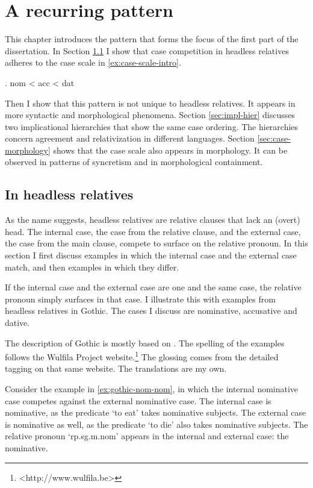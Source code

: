 
\chapter{A recurring pattern}\label{ch:recurring}

This chapter introduces the pattern that forms the focus of the first part of the dissertation. In Section \ref{sec:pattern-rels} I show that case competition in headless relatives adheres to the case scale in \ref{ex:case-scale-intro}.

\ex. \ac{nom} < \ac{acc} < \ac{dat}\label{ex:case-scale-intro}

Then I show that this pattern is not unique to headless relatives. It appears in more syntactic and morphological phenomena. Section \ref{sec:impl-hier} discusses two implicational hierarchies that show the same case ordering. The hierarchies concern agreement and relativization in different languages. Section \ref{sec:case-morphology} shows that the case scale also appears in morphology. It can be observed in patterns of syncretism and in morphological containment.


\section{In headless relatives}\label{sec:pattern-rels}

As the name suggests, headless relatives are relative clauses that lack an (overt) head. The internal case, the case from the relative clause, and the external case, the case from the main clause, compete to surface on the relative pronoun. In this section I first discuss examples in which the internal case and the external case match, and then examples in which they differ.

If the internal case and the external case are one and the same case, the relative pronoun simply surfaces in that case. I illustrate this with examples from headless relatives in Gothic. The cases I discuss are nominative, accusative and dative.

The description of Gothic is mostly based on \citep{harbert1978}. The spelling of the examples follows the Wulfila Project website.\footnote{
<http://www.wulfila.be>
} The glossing comes from the detailed tagging on that same website. The translations are my own.

Consider the example in \ref{ex:gothic-nom-nom}, in which the internal nominative case competes against the external nominative case.
The internal case is nominative, as the predicate  `to eat' takes nominative subjects.
The external case is nominative as well, as the predicate  `to die' also takes nominative subjects.
The relative pronoun  `\ac{rp}.\ac{sg}.\ac{m}.\ac{nom}' appears in the internal and external case: the nominative.

